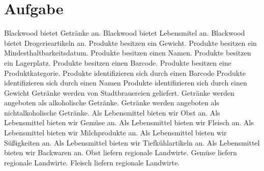 \documentclass[a4paper,10pt]{scrartcl}
\begin{document}
\section{Aufgabe}
Blackwood bietet Getränke an.\newline
Blackwood bietet Lebensmitel an.\newline
Blackwood bietet Drogerieartikeln an.\newline
\newline
Produkte besitzen ein Gewicht.\newline
Produkte besitzen ein Mindesthaltbarkeitsdatum.\newline
Produkte besitzen einen Namen.\newline
Produkte besitzen ein Lagerplatz.\newline
Produkte besitzen einen Barcode.\newline
Produkte besitzen eine Produktkategorie.\newline
\newline
Produkte identifizieren sich durch einen Barcode \newline
Produkte identifizieren sich durch einen Namen \newline
Produkte identifizieren sich durch einen Gewicht \newline
\newline
Getränke werden von Stadtbrauereien geliefert.\newline
Getränke werden angeboten als alkoholische Getränke.\newline
Getränke werden angeboten als nichtalkoholische Getränke.\newline
\newline
Als Lebensmittel bieten wir Obst an.\newline
Als Lebensmittel bieten wir Gemüse an.\newline
Als Lebensmittel bieten wir Fleisch an.\newline
Als Lebensmittel bieten wir Milchprodukte an.\newline
Als Lebensmittel bieten wir Süßigkeiten an.\newline
Als Lebensmittel bieten wir Tiefkühlartikeln an.\newline
Als Lebensmittel bieten wir Backwaren an.\newline
\newline
Obst liefern regionale Landwirte.\newline
Gemüse liefern regionale Landwirte.\newline
Fleisch liefern regionale Landwirte.\newline
\end{document}
